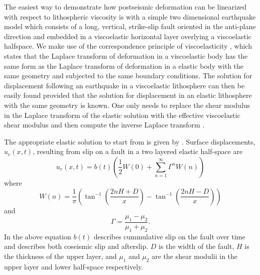 \documentclass[12pt]{article}
\begin{document}
The easiest way to demonstrate how postseismic deformation can be
linearized with respect to lithospheric viscosity is with a simple two
dimensional earthquake model which consists of a long, vertical,
strike-slip fault oriented in the anti-plane direction and embedded in
a viscoelastic horizontal layer overlying a viscoelastic halfspace.
We make use of the correspondence principle of viscoelasticity
\citep{F1975}, which states that the Laplace transform of deformation
in a viscoelastic body has the same form as the Laplace transform of
deformation in a elastic body with the same geometry and subjected to
the same boundary conditions. The solution for displacement following
an earthquake in a viscoelastic lithosphere can then be easily found
provided that the solution for displacement in an elastic lithosphere
with the same geometry is known.  One only needs to replace the shear
modulus in the Laplace transform of the elastic solution with the
effective viscoelastic shear modulus and then compute the inverse
Laplace transform \citep[e.g.][]{HH2005,NM1974,SP1978}.

The appropriate elastic solution to start from
is given by \citet{R1971}.  Surface displacements, $u_{e}(x,t)$,
resulting from slip on a fault in a two layered elastic half-space
are
\begin{equation}\label{TwoLayerElastic}
  u_{e}(x,t) = b(t)\left(\frac{1}{2} W(0) + 
    \sum_{n=1}^\infty \Gamma^nW(n)\right)
\end{equation}
where
\begin{equation}
  W(n) = \frac{1}{\pi}\left(\tan^{-1}(\frac{2nH + D}{x}) 
    - \tan^{-1}(\frac{2nH - D}{x})\right)
\end{equation}
and
\begin{equation}
  \Gamma = \frac{\mu_1 - \mu_2}{\mu_1 + \mu_2}.
\end{equation}
In the above equation $b(t)$ describes cummulative slip on the fault
over time and describes both coseismic slip and afterslip. $D$ is the
width of the fault, $H$ is the thickness of the upper layer, and
$\mu_1$ and $\mu_2$ are the shear modulii in the upper layer and lower
half-space respectively.
\end{document}
